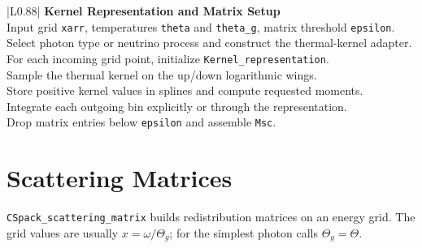 \documentclass[11pt]{article}
\begin{document}
\begin{center}
\small
\begin{tabular}{|L{0.88\linewidth}|}
\hline
\textbf{Kernel Representation and Matrix Setup} \\
\hline
Input grid \texttt{xarr}, temperatures \texttt{theta} and \texttt{theta\_g}, matrix threshold \texttt{epsilon}. \\
\hline
Select photon type or neutrino process and construct the thermal-kernel adapter. \\
\hline
For each incoming grid point, initialize \texttt{Kernel\_representation}. \\
\hline
Sample the thermal kernel on the up/down logarithmic wings. \\
\hline
Store positive kernel values in splines and compute requested moments. \\
\hline
Integrate each outgoing bin explicitly or through the representation. \\
\hline
Drop matrix entries below \texttt{epsilon} and assemble \texttt{Msc}. \\
\hline
\end{tabular}
\end{center}

\section{Scattering Matrices}

\texttt{CSpack\_scattering\_matrix} builds redistribution matrices on an energy
grid. The grid values are usually $x=\omega/\Theta_g$; for the simplest photon
calls $\Theta_g=\Theta$.
\end{document}
